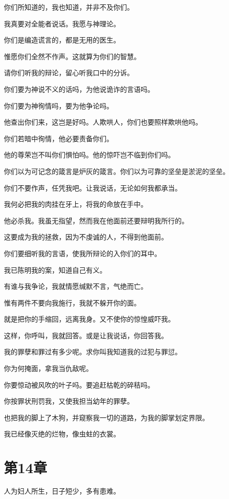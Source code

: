 \documentclass[12pt,oneside]{book}
\begin{document}
你们所知道的，我也知道，并非不及你们。

我真要对全能者说话。我愿与神理论。

你们是编造谎言的，都是无用的医生。

惟愿你们全然不作声。这就算为你们的智慧。

请你们听我的辩论，留心听我口中的分诉。

你们要为神说不义的话吗，为他说诡诈的言语吗。

你们要为神徇情吗，要为他争论吗。

他查出你们来，这岂是好吗。人欺哄人，你们也要照样欺哄他吗。

你们若暗中徇情，他必要责备你们。

他的尊荣岂不叫你们惧怕吗。他的惊吓岂不临到你们吗。

你们以为可记念的箴言是炉灰的箴言。你们以为可靠的坚垒是淤泥的坚垒。

你们不要作声，任凭我吧。让我说话，无论如何我都承当。

我何必把我的肉挂在牙上，将我的命放在手中。

他必杀我。我虽无指望，然而我在他面前还要辩明我所行的。

这要成为我的拯救，因为不虔诚的人，不得到他面前。

你们要细听我的言语，使我所辩论的入你们的耳中。

我已陈明我的案，知道自己有义。

有谁与我争论，我就情愿缄默不言，气绝而亡。

惟有两件不要向我施行，我就不躲开你的面。

就是把你的手缩回，远离我身。又不使你的惊惶威吓我。

这样，你呼叫，我就回答。或是让我说话，你回答我。

我的罪孽和罪过有多少呢。求你叫我知道我的过犯与罪愆。

你为何掩面，拿我当仇敌呢。

你要惊动被风吹的叶子吗。要追赶枯乾的碎秸吗。

你按罪状刑罚我，又使我担当幼年的罪孽。

也把我的脚上了木狗，并窥察我一切的道路，为我的脚掌划定界限。

我已经像灭绝的烂物，像虫蛀的衣裳。



\chapter{第14章}
人为妇人所生，日子短少，多有患难。
\end{document}

